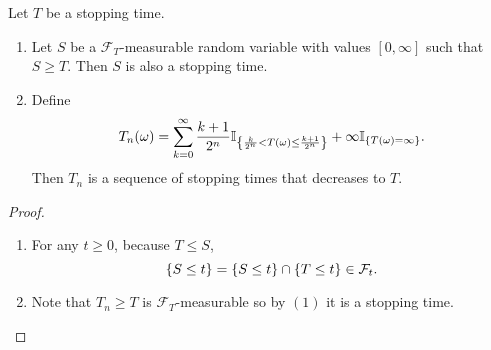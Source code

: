\begin{prop}
    Let $T$ be a stopping time. 
    \begin{enumerate}[label=(\arabic{*})]
        \item Let $S$ be a $\mathcal{F}_T$-measurable random variable with values $[0,\infty]$ such that $S \geq T$. Then $S$ is also a stopping time.

        \item Define
        \begin{equation*}
            T_n (\omega) = \sum_{k=0}^\infty \frac{k+1}{2^n}\mathbb{I}_{\left\{\frac{k}{2^n} < T(\omega) \leq \frac{k+1}{2^n}\right\}} + \infty \mathbb{I}_{\left\{T(\omega) = \infty\right\}}.
        \end{equation*}
        Then $T_n$ is a sequence of stopping times that decreases to $T$.
    \end{enumerate}
\end{prop}
\begin{proof}
    \begin{enumerate}[label=(\arabic{*})]
        \item For any $t \geq 0$, because $T \leq S$,
        \begin{equation*}
            \left\{S \leq t\right\} = \left\{S \leq t\right\} \cap \left\{T \leq t\right\} \in \mathcal{F}_t.
        \end{equation*}

        \item Note that $T_n \geq T$ is $\mathcal{F}_T$-measurable so by $(1)$ it is a stopping time.
    \end{enumerate}
\end{proof}


